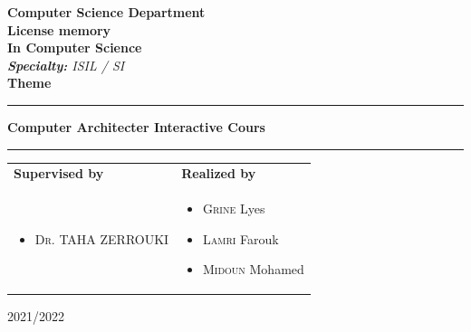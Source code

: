 \begin{titlepage}
\begin{center}
{ \textbf{Computer Science Department}}\\ \vspace{0.8cm}
\Huge{\textbf{License memory}} \\ \Large{\textbf{In Computer Science}} \\\vspace{0.3cm}
\large{\emph{\textbf{Specialty: } ISIL / SI}}\\ \vspace{0.8cm}
\huge{\textbf{Theme}}\\ %
\noindent\rule{\textwidth}{1mm}
\Large{\textbf{Computer Architecter Interactive Cours}}
\noindent\rule{\textwidth}{1mm}
\end{center}
\vspace{0.3cm}
\begin{tabular}{ p{9cm}  p{6cm} }
\textbf{Supervised by} & \textbf{Realized by} \\
\begin{itemize}
	\item \textsc{Dr.} TAHA ZERROUKI
\end{itemize}
&
\begin{itemize}
	\item \textsc{Grine} Lyes
  \item \textsc{Lamri} Farouk
	\item \textsc{Midoun} Mohamed
\end{itemize}
\\
\end{tabular}
\vspace{3.5cm}
\begin{center}
2021/2022
\end{center}

\end{titlepage}